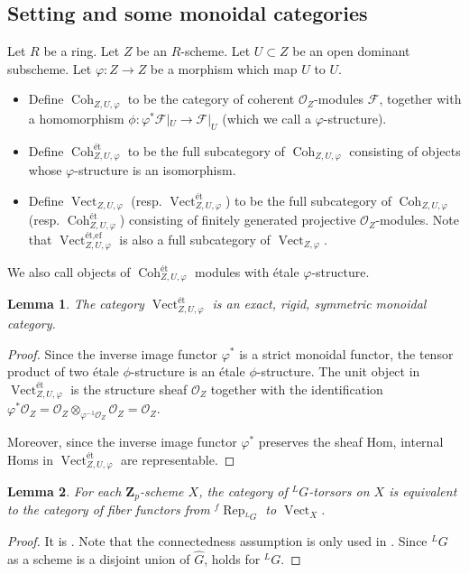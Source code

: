 \documentclass[11pt]{amsart}
\newtheorem{lem}{Lemma}
\numberwithin{thm}{section}
\numberwithin{lem}{section}
\numberwithin{cor}{section}
\numberwithin{prop}{section}
\numberwithin{exam}{section}
\numberwithin{dfn}{section}
\newcommand{\wh}[1]{\widehat{#1}}
\newcommand{\frep}{^f\operatorname{Rep}}
\newcommand{\Vect}{\operatorname{Vect}}
\newcommand{\Coh}{\operatorname{Coh}}
\newcommand{\mysection}{\subsection}
\newcommand{\cO}{\mathcal{O}}
\newcommand{\cF}{\mathcal{F}}
\newcommand{\et}{\text{\'et}}
\newcommand{\ef}{\text{ef}}
\newcommand{\Z}{\mathbf{Z}}
\newcommand{\lsup}[2]{{^{#1}\!#2}}
\newcommand{\lG}{{\lsup LG}}
\begin{document}
\begin{appendices}
\mysection{Setting and some monoidal categories}
\label{et-phi-mod}
Let $R$ be a ring.
Let $Z$ be an $R$-scheme.
Let $U \subset Z$ be an open dominant subscheme.
Let $\varphi: Z\to Z$ be a morphism which map $U$ to $U$.
\begin{itemize}
\item 
Define $\Coh_{Z,U,\varphi}$ to be the category of
coherent $\cO_Z$-modules $\cF$, together with a homomorphism
$\phi:\varphi^*\cF|_U \to \cF|_U$
(which we call a $\varphi$-structure).
\item
Define $\Coh_{Z,U,\varphi}^\et$ to be the full subcategory
of $\Coh_{Z,U,\varphi}$ consisting of objects whose $\varphi$-structure
is an isomorphism.
\item
Define $\Vect_{Z,U,\varphi}$ (resp. $\Vect_{Z,U,\varphi}^\et$) to be the full subcategory
of $\Coh_{Z,U,\varphi}$ (resp. $\Coh_{Z,U,\varphi}^\et$) consisting of finitely generated projective
$\cO_Z$-modules.
Note that $\Vect_{Z, U, \varphi}^{\et, \ef}$
is also a full subcategory of $\Vect_{Z, \varphi}$.
\end{itemize}
We also call objects of $\Coh_{Z,U,\varphi}^{\et}$ {modules
with \'etale $\varphi$-structure}.


\begin{lem}
\label{cat-lem2}
The category $\Vect_{Z,U,\varphi}^\et$ is 
an exact, rigid, symmetric monoidal category.
\end{lem}

\begin{proof}
Since the inverse image functor $\varphi^*$ is a strict monoidal functor,
the tensor product of two \'etale $\phi$-structure
is an \'etale $\phi$-structure.
The unit object in $\Vect_{Z,U,\varphi}^\et$
is the structure sheaf $\cO_Z$ together with the identification
$\varphi^* \cO_Z  = \cO_Z\otimes_{\varphi^{-1}\cO_Z}\cO_Z = \cO_Z$.

Moreover, since the inverse image functor $\varphi^*$
preserves the sheaf Hom, internal Homs in $\Vect_{Z,U,\varphi}^\et$
are representable.
\end{proof}

\begin{lem}
\label{lem:lG-tan}
For each $\Z_p$-scheme $X$,
the category of $\lG$-torsors on $X$
is equivalent to the category of fiber functors
from $\frep_{\lsup LG}$ to $\Vect_X$.
\end{lem}

\begin{proof}
It is \cite[Theorem 2.5.2]{Lev13}.
Note that the connectedness assumption is only used
in \cite[Proposition C.1.8]{Lev13}.
Since $\lG$ as a scheme is a disjoint union of $\wh G$,
\cite[Proposition C.1.8]{Lev13} holds for $\lG$.
\end{proof}


\end{appendices}
\end{document}
